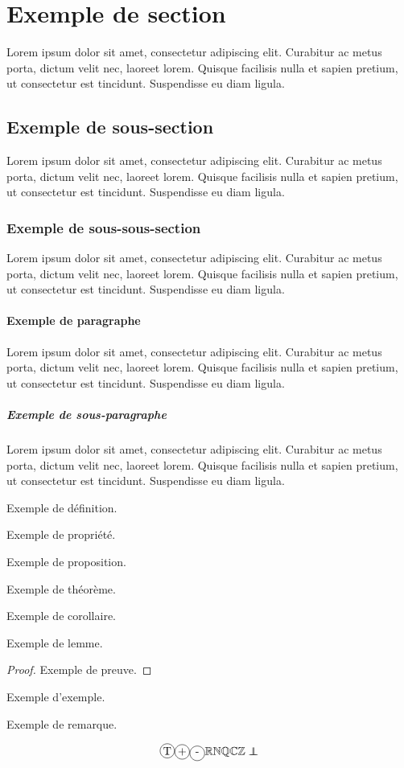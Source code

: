 \newcommand{\lorem}{Lorem ipsum dolor sit amet, consectetur adipiscing elit. Curabitur ac metus porta, dictum velit nec, laoreet lorem. Quisque facilisis nulla et sapien pretium, ut consectetur est tincidunt. Suspendisse eu diam ligula.}

\section{Exemple de section}
\lorem

\subsection{Exemple de sous-section}
\lorem
\subsubsection{Exemple de sous-sous-section}
\lorem
\paragraph{Exemple de paragraphe}
\lorem
\subparagraph{Exemple de sous-paragraphe}
\lorem

\begin{definition}
    Exemple de définition.
\end{definition}

\begin{propriety}
    Exemple de propriété.
\end{propriety}

\begin{proposition}
    Exemple de proposition.
\end{proposition}

\begin{theorem}
    Exemple de théorème.
\end{theorem}

\begin{corollary}
    Exemple de corollaire.
\end{corollary}

\begin{lemma}
    Exemple de lemme.
\end{lemma}

\begin{proof}
    Exemple de preuve.
\end{proof}

\begin{example}
    Exemple d'exemple.
\end{example}

\begin{remark}
    Exemple de remarque.
\end{remark}

$$\circled{T} \cplus \cminus \R \N \Q \C \Z \independant$$
